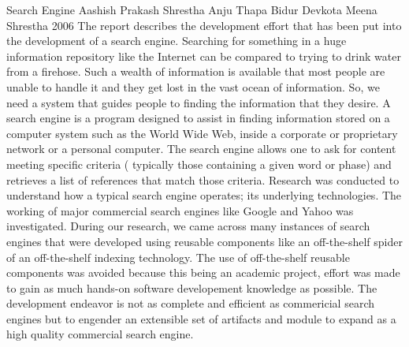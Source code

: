  \begin{conf-abstract}[]
{Search Engine}
{
Aashish Prakash Shrestha
Anju Thapa
Bidur Devkota
Meena Shrestha
}
{2006}
The report describes the development effort that has been put into the development of a search engine. Searching for something in a huge information repository like the Internet can be compared to trying to drink water from a firehose. Such a wealth of information is available that most people are unable to handle it and they get lost in the vast ocean of information. So, we need a system that guides people to finding the information that they desire. A search engine is a program designed to assist in finding information stored on a computer system such as the World Wide Web, inside a corporate or proprietary network or a personal computer. The search engine allows one to ask for content meeting specific criteria ( typically those containing a given word or phase) and retrieves a list of references that match those criteria. Research was conducted to understand how a typical search engine operates; its underlying technologies. The working of major commercial search engines like Google and Yahoo was investigated. During our research, we came across many instances of search engines that were developed using reusable components like an off-the-shelf spider of an off-the-shelf indexing technology. The use of off-the-shelf reusable components was avoided because this being an academic project, effort was made to gain as much hands-on software developement knowledge as possible. The development endeavor is not as complete and efficient as commericial search engines but to engender an extensible set of artifacts and module to expand as a high quality commercial search engine.
  \end{conf-abstract}